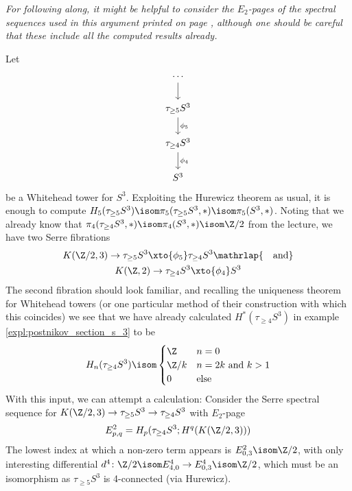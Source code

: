 \begin{solution}
	\emph{For following along, it might be helpful to consider the $E_2$-pages of the spectral sequences used in this argument printed on page \pageref{fig:firstspecseq}, although one should be careful that these include all the computed results already.}

	Let 
	\begin{equation*}
		\begin{tikzcd}
			\cdots
				\ar[d]
			\\
			\tau_{\geq 5} S^3
				\ar[d, "\phi_5"]
			\\
			\tau_{\geq 4} S^3
				\ar[d, "\phi_4"]
			\\
			S^3
		\end{tikzcd}
	\end{equation*}
	be a Whitehead tower for $S^3$.
	Exploiting the Hurewicz theorem as usual, it is enough to compute $H_5(\tau_{\geq 5} S^3) \isom \pi_5(\tau_{\geq 5} S^3, *) \isom \pi_5(S^3, *)$.
	Noting that we already know that $\pi_4(\tau_{\geq 4} S^3, *) \isom \pi_4(S^3, *) \isom \Zn{2}$ from the lecture, we have two Serre fibrations
	\begin{gather*}
		K(\Zn{2}, 3) \to \tau_{\geq 5} S^3 \xto{\phi_5} \tau_{\geq 4} S^3 \mathrlap{\quad\text{and}}\\
		K(\Z, 2) \to \tau_{\geq 4} S^3 \xto{\phi_4} S^3
	\end{gather*}
	The second fibration should look familiar, and recalling the uniqueness theorem for Whitehead towers (or one particular method of their construction with which this coincides) we see that we have already calculated $H^*(\tau_{\geq 4} S^3)$ in example \ref{expl:postnikov_section_s_3} to be  
	\begin{equation*}
		H_n(\tau_{\geq 4} S^3) \isom \begin{cases}
			\Z 		& n = 0 \\
			\Zn{k} 	& n = 2k \text{ and } k > 1 \\
			0 		& \text{else}
		\end{cases}
	\end{equation*}
	With this input, we can attempt a calculation:
	Consider the Serre spectral sequence for $K(\Zn{2}, 3) \to \tau_{\geq 5} S^3 \to \tau_{\geq 4} S^3$ with $E_2$-page
	\begin{equation*}
		E^2_{p, q} = H_p(\tau_{\geq 4} S^3; H^q(K(\Zn{2}, 3)))
	\end{equation*}
	The lowest index at which a non-zero term appears is $E^2_{0, 3} \isom \Zn{2}$, with only interesting differential $d^4\colon \Zn{2} \isom E^4_{4, 0} \to E^4_{0, 3} \isom \Zn{2}$, which must be an isomorphism as $\tau_{\geq 5} S^3$ is 4-connected (via Hurewicz).

\end{solution}
